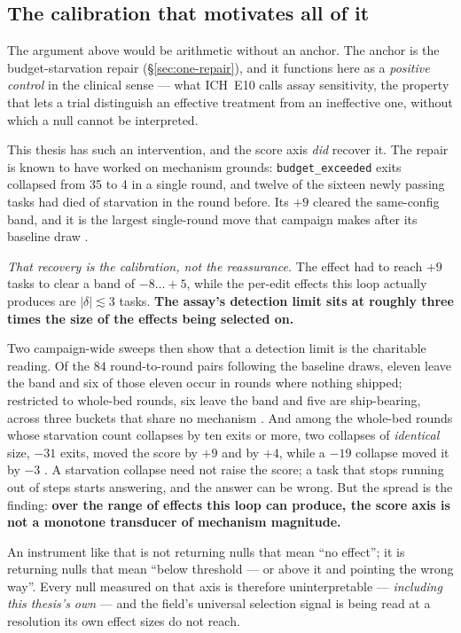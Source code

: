 \subsection*{The calibration that motivates all of it}

The argument above would be arithmetic without an anchor. The anchor is the
budget-starvation repair (\S\ref{sec:one-repair}), and it functions here as
a \emph{positive control} in the clinical sense --- what ICH~E10 calls
assay sensitivity, the property that lets a trial distinguish an effective
treatment from an ineffective one, without which a null cannot be
interpreted.

This thesis has such an intervention, and the score axis \emph{did} recover
it. The repair is known to have worked on mechanism grounds:
\texttt{budget\_exceeded} exits collapsed from 35 to 4 in a single round,
and twelve of the sixteen newly passing tasks had died of starvation in the
round before. Its $+9$ cleared the same-config band, and it is the largest
single-round move that campaign makes after its baseline draw .

\emph{That recovery is the calibration, not the reassurance.} The effect
had to reach $+9$ tasks to clear a band of $-8\ldots{+}5$, while the
per-edit effects this loop actually produces are $|\delta| \lesssim 3$
tasks. \textbf{The assay's detection limit sits at roughly three times the
size of the effects being selected on.}

Two campaign-wide sweeps then show that a detection limit is the charitable
reading. Of the $84$ round-to-round pairs following the baseline draws,
eleven leave the band and six of those eleven occur in rounds where nothing
shipped; restricted to whole-bed rounds, six leave the band and five are
ship-bearing, across three buckets that share no mechanism . And
among the whole-bed rounds whose starvation count collapses by ten exits or
more, two collapses of \emph{identical} size, $-31$ exits, moved the score
by $+9$ and by $+4$, while a $-19$ collapse moved it by $-3$ . A
starvation collapse need not raise the score; a task that stops running out
of steps starts answering, and the answer can be wrong. But the spread is
the finding: \textbf{over the range of effects this loop can produce, the
score axis is not a monotone transducer of mechanism magnitude.}

An instrument like that is not returning nulls that mean ``no effect''; it
is returning nulls that mean ``below threshold --- or above it and pointing
the wrong way''. Every null measured on that axis is therefore
uninterpretable --- \emph{including this thesis's own} --- and the field's
universal selection signal is being read at a resolution its own effect
sizes do not reach.

